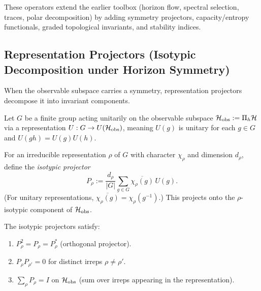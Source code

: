 \label{sec:advanced-operators-ii}

These operators extend the earlier toolbox (horizon flow, spectral selection, traces, polar decomposition) by adding symmetry projectors, capacity/entropy functionals, graded topological invariants, and stability indices.

\subsection{Representation Projectors (Isotypic Decomposition under Horizon Symmetry)}
\label{subsec:representation-projector}

When the observable subspace carries a symmetry, representation projectors decompose it into invariant components.

\begin{definition}
\label{def:group-action}
Let $G$ be a finite group acting unitarily on the observable subspace $\mathcal{H}_{\mathrm{obs}} := \Pi_{h} \mathcal{H}$ via a representation $U: G \to U(\mathcal{H}_{\mathrm{obs}})$, meaning $U(g)$ is unitary for each $g \in G$ and $U(gh) = U(g)U(h)$.
\end{definition}

\begin{definition}
\label{def:isotypic-projector}
For an irreducible representation $\rho$ of $G$ with character $\chi_\rho$ and dimension $d_\rho$, define the \emph{isotypic projector}
\[
P_\rho := \frac{d_\rho}{|G|} \sum_{g \in G} \overline{\chi_\rho(g)}\, U(g).
\]
(For unitary representations, $\overline{\chi_\rho(g)} = \chi_\rho(g^{-1})$.)
This projects onto the $\rho$-isotypic component of $\mathcal{H}_{\mathrm{obs}}$.
\end{definition}

\begin{proposition}
\label{prop:isotypic-properties}
The isotypic projectors satisfy:
\begin{enumerate}[label=(\roman*)]
\item $P_\rho^2 = P_\rho = P_\rho^*$ (orthogonal projector).
\item $P_\rho P_{\rho'} = 0$ for distinct irreps $\rho \ne \rho'$.
\item $\sum_{\rho} P_\rho = I$ on $\mathcal{H}_{\mathrm{obs}}$ (sum over irreps appearing in the representation).
\end{enumerate}
\end{proposition}

